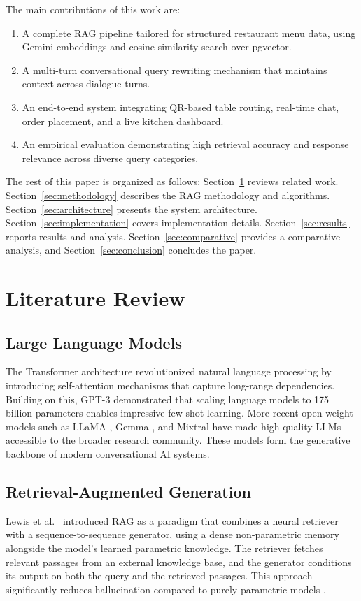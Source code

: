 The main contributions of this work are:
\begin{enumerate}
    \item A complete RAG pipeline tailored for structured restaurant menu data, using Gemini embeddings and cosine similarity search over pgvector.
    \item A multi-turn conversational query rewriting mechanism that maintains context across dialogue turns.
    \item An end-to-end system integrating QR-based table routing, real-time chat, order placement, and a live kitchen dashboard.
    \item An empirical evaluation demonstrating high retrieval accuracy and response relevance across diverse query categories.
\end{enumerate}

The rest of this paper is organized as follows: Section~\ref{sec:litreview} reviews related work. Section~\ref{sec:methodology} describes the RAG methodology and algorithms. Section~\ref{sec:architecture} presents the system architecture. Section~\ref{sec:implementation} covers implementation details. Section~\ref{sec:results} reports results and analysis. Section~\ref{sec:comparative} provides a comparative analysis, and Section~\ref{sec:conclusion} concludes the paper.


\section{Literature Review}\label{sec:litreview}

\subsection{Large Language Models}
The Transformer architecture \cite{Vaswani2017Attention} revolutionized natural language processing by introducing self-attention mechanisms that capture long-range dependencies. Building on this, GPT-3 \cite{Brown2020GPT3} demonstrated that scaling language models to 175 billion parameters enables impressive few-shot learning. More recent open-weight models such as LLaMA \cite{Touvron2023LLaMA}, Gemma \cite{Gemma2024}, and Mixtral \cite{Jiang2024Mixtral} have made high-quality LLMs accessible to the broader research community. These models form the generative backbone of modern conversational AI systems.

\subsection{Retrieval-Augmented Generation}
Lewis et al.\ \cite{Lewis2020RAG} introduced RAG as a paradigm that combines a neural retriever with a sequence-to-sequence generator, using a dense non-parametric memory alongside the model's learned parametric knowledge. The retriever fetches relevant passages from an external knowledge base, and the generator conditions its output on both the query and the retrieved passages. This approach significantly reduces hallucination compared to purely parametric models \cite{Huang2023Hallucination, Tonmoy2024Hallucination}.

